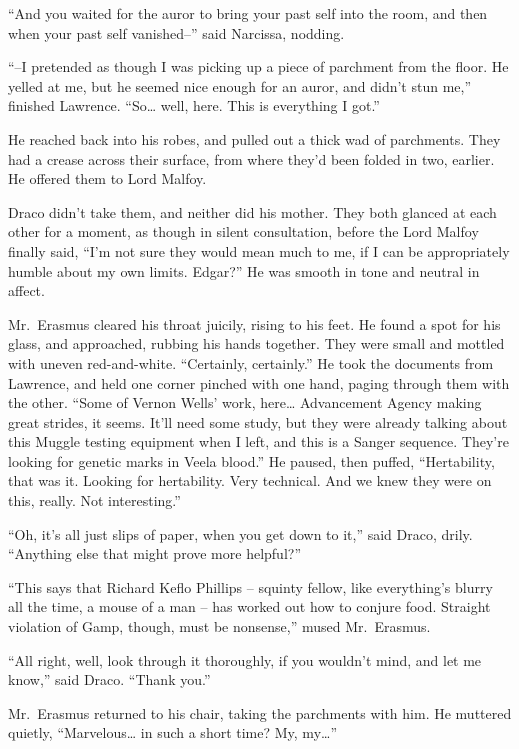 ``And you waited for the auror to bring your past self into the room,
and then when your past self vanished--'' said Narcissa, nodding.

``--I pretended as though I was picking up a piece of parchment from the
floor. He yelled at me, but he seemed nice enough for an auror, and
didn't stun me,'' finished Lawrence. ``So\ldots{} well, here. This is
everything I got.''

He reached back into his robes, and pulled out a thick wad of
parchments. They had a crease across their surface, from where they'd
been folded in two, earlier. He offered them to Lord Malfoy.

Draco didn't take them, and neither did his mother. They both glanced at
each other for a moment, as though in silent consultation, before the
Lord Malfoy finally said, ``I'm not sure they would mean much to me, if
I can be appropriately humble about my own limits. Edgar?'' He was
smooth in tone and neutral in affect.

Mr.~Erasmus cleared his throat juicily, rising to his feet. He found a
spot for his glass, and approached, rubbing his hands together. They
were small and mottled with uneven red-and-white. ``Certainly,
certainly.'' He took the documents from Lawrence, and held one corner
pinched with one hand, paging through them with the other. ``Some of
Vernon Wells' work, here\ldots{} Advancement Agency making great
strides, it seems. It'll need some study, but they were already talking
about this Muggle testing equipment when I left, and this is a Sanger
sequence. They're looking for genetic marks in Veela blood.'' He paused,
then puffed, ``Hertability, that was it. Looking for hertability. Very
technical. And we knew they were on this, really. Not interesting.''

``Oh, it's all just slips of paper, when you get down to it,'' said
Draco, drily. ``Anything else that might prove more helpful?''

``This says that Richard Keflo Phillips -- squinty fellow, like
everything's blurry all the time, a mouse of a man -- has worked out how
to conjure food. Straight violation of Gamp, though, must be nonsense,''
mused Mr.~Erasmus.

``All right, well, look through it thoroughly, if you wouldn't mind, and
let me know,'' said Draco. ``Thank you.''

Mr.~Erasmus returned to his chair, taking the parchments with him. He
muttered quietly, ``Marvelous\ldots{} in such a short time? My,
my\ldots{}''

